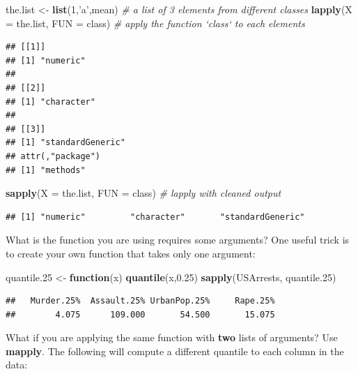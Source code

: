 \documentclass[]{book}
\newenvironment{Shaded}{\begin{snugshade}}{\end{snugshade}}
\newcommand{\CommentTok}[1]{\textcolor[rgb]{0.56,0.35,0.01}{\textit{#1}}}
\newcommand{\ControlFlowTok}[1]{\textcolor[rgb]{0.13,0.29,0.53}{\textbf{#1}}}
\newcommand{\DataTypeTok}[1]{\textcolor[rgb]{0.13,0.29,0.53}{#1}}
\newcommand{\DecValTok}[1]{\textcolor[rgb]{0.00,0.00,0.81}{#1}}
\newcommand{\FloatTok}[1]{\textcolor[rgb]{0.00,0.00,0.81}{#1}}
\newcommand{\KeywordTok}[1]{\textcolor[rgb]{0.13,0.29,0.53}{\textbf{#1}}}
\newcommand{\NormalTok}[1]{#1}
\newcommand{\StringTok}[1]{\textcolor[rgb]{0.31,0.60,0.02}{#1}}
\theoremstyle{definition}
\theoremstyle{definition}
\theoremstyle{definition}
\theoremstyle{remark}
\begin{document}
\begin{Shaded}
\begin{Highlighting}[]
\NormalTok{the.list <-}\StringTok{ }\KeywordTok{list}\NormalTok{(}\DecValTok{1}\NormalTok{,}\StringTok{'a'}\NormalTok{,mean) }\CommentTok{# a list of 3 elements from different classes}
\KeywordTok{lapply}\NormalTok{(}\DataTypeTok{X =}\NormalTok{ the.list, }\DataTypeTok{FUN =}\NormalTok{ class) }\CommentTok{# apply the function `class` to each elements}
\end{Highlighting}
\end{Shaded}

\begin{verbatim}
## [[1]]
## [1] "numeric"
## 
## [[2]]
## [1] "character"
## 
## [[3]]
## [1] "standardGeneric"
## attr(,"package")
## [1] "methods"
\end{verbatim}

\begin{Shaded}
\begin{Highlighting}[]
\KeywordTok{sapply}\NormalTok{(}\DataTypeTok{X =}\NormalTok{ the.list, }\DataTypeTok{FUN =}\NormalTok{ class) }\CommentTok{# lapply with cleaned output}
\end{Highlighting}
\end{Shaded}

\begin{verbatim}
## [1] "numeric"         "character"       "standardGeneric"
\end{verbatim}

What is the function you are using requires some arguments?
One useful trick is to create your own function that takes only one argument:

\begin{Shaded}
\begin{Highlighting}[]
\NormalTok{quantile}\FloatTok{.25}\NormalTok{ <-}\StringTok{ }\ControlFlowTok{function}\NormalTok{(x) }\KeywordTok{quantile}\NormalTok{(x,}\FloatTok{0.25}\NormalTok{)}
\KeywordTok{sapply}\NormalTok{(USArrests, quantile}\FloatTok{.25}\NormalTok{)}
\end{Highlighting}
\end{Shaded}

\begin{verbatim}
##   Murder.25%  Assault.25% UrbanPop.25%     Rape.25% 
##        4.075      109.000       54.500       15.075
\end{verbatim}

What if you are applying the same function with \textbf{two} lists of arguments? Use \textbf{mapply}.
The following will compute a different quantile to each column in the data:
\end{document}
